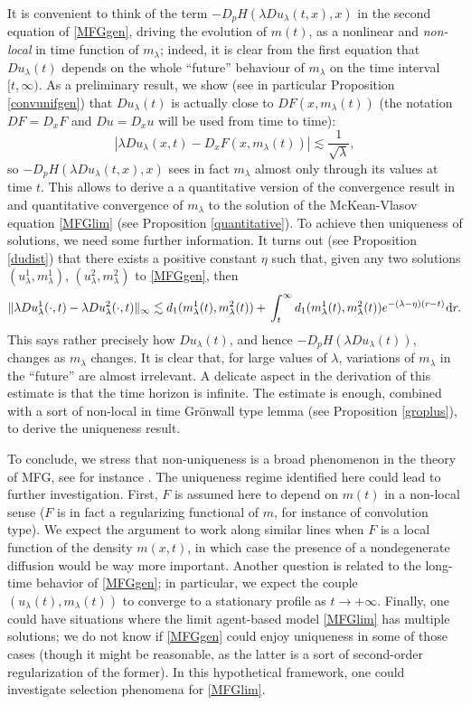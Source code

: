 \documentclass{amsart}
\theoremstyle{remark}
\theoremstyle{definition}
\theoremstyle{Claim}
\newcommand{\dd}{\hspace{0.7pt}{\rm d}}
\theoremstyle{plain}
\begin{document}
	It is convenient to think of the term $-D_pH(\lambda Du_\lambda(t,x),x)$ in the second equation of \eqref{MFGgen}, driving the evolution of $m(t)$, as a nonlinear and \textit{non-local} in time function of $m_\lambda$; indeed, it is clear from the first equation that $Du_\lambda(t)$ depends on the whole ``future'' behaviour of $m_\lambda$ on the time interval $[t, \infty)$. As a preliminary result, we show (see in particular Proposition \ref{convunifgen}) that $Du_\lambda(t)$ is actually close to $DF(x,m_\lambda(t))$ (the notation $D F= D_x F$ and $D u= D_x u$ will be used from time to time): 
		$$\left| \lambda D u_\lambda(x,t)-D_xF(x,m_\lambda(t))\right| \lesssim \frac{1}{\sqrt{\lambda}},
		$$ 
	so $-D_pH(\lambda Du_\lambda(t,x),x)$ sees in fact $m_\lambda$ almost only through its values at time $t$. This allows to derive a a quantitative version of the convergence result in \cite{BC} and quantitative convergence of $m_\lambda$ to the solution of the McKean-Vlasov equation \eqref{MFGlim} (see Proposition \ref{quantitative}). To achieve then uniqueness of solutions, we need some further information. It turns out (see Proposition \ref{dudist}) that there exists a positive constant $\eta$ such that, given any two solutions $(u_\lambda^1, m_\lambda^1)$, $(u_\lambda^2, m_\lambda^2)$ to \eqref{MFGgen}, then
	\[
	 \| \lambda D u_\lambda^1(\cdot,t) - \lambda D u_\lambda^2(\cdot,t) \|_\infty  \lesssim
	  d_1(m_\lambda^1(t), m_\lambda^2(t)) + \\
	 \int_{t}^{\infty}  d_1(m_\lambda^1(t), m_\lambda^2(t)) e^{-(\lambda - \eta) (r-t)}  \dd r.
	\]
	This says rather precisely how $D u_\lambda(t)$, and hence $-D_pH(\lambda Du_\lambda(t))$, changes as $m_\lambda$ changes. It is clear that, for large values of $\lambda$, variations of $m_\lambda$ in the ``future'' are almost irrelevant. A delicate aspect in the derivation of this estimate is that the time horizon is infinite. The estimate is enough, combined with a sort of non-local in time Gr\"onwall type lemma (see Proposition \ref{groplus}), to derive the uniqueness result.
	
	\smallskip
	
	To conclude, we stress that non-uniqueness is a broad phenomenon in the theory of MFG, see for instance \cite{BF, CB18, C19, CT19, BZ20}. The uniqueness regime identified here could lead to further investigation. First, $F$ is assumed here to depend on $m(t)$ in a non-local sense ($F$ is in fact a regularizing functional of $m$, for instance of convolution type). We expect the argument to work along similar lines when $F$ is a local function of the density $m(x,t)$, in which case the presence of a nondegenerate diffusion would be way more important. Another question is related to the long-time behavior of \eqref{MFGgen}; in particular, we expect the couple $(u_\lambda(t), m_\lambda(t))$ to converge to a stationary profile as $t \to +\infty$. Finally, one could have situations where the limit agent-based model \eqref{MFGlim} has multiple solutions; we do not know if \eqref{MFGgen} could enjoy uniqueness in some of those cases (though it might be reasonable, as the latter is a sort of second-order regularization of the former). In this hypothetical framework, one could investigate selection phenomena for \eqref{MFGlim}.
		
\end{document}

